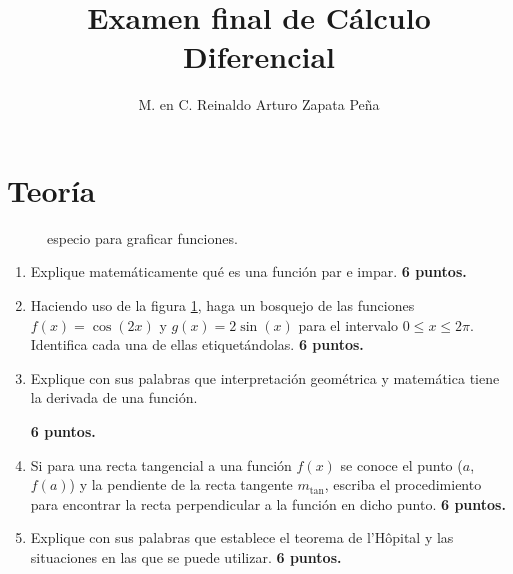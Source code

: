 \documentclass{article}
\title{Examen final de Cálculo Diferencial}
\author{M. en C. Reinaldo Arturo Zapata Peña}
\begin{document}


\section{Teoría} %
\label{sec:teoria}


\begin{figure}[b]
    \centering
    \caption{especio  para graficar funciones.}
    \label{fig:graficar}
\end{figure}
\begin{enumerate}
\item Explique matemáticamente qué es una función par e impar.
\hfill \textbf{6 puntos.}

\item Haciendo uso de la figura \ref{fig:graficar}, haga un bosquejo de las
funciones $f(x)=\cos(2x)$ y $g(x)=2\sin(x)$ para el intervalo $0 \leq x \leq
2\pi$. Identifica cada una de ellas etiquet\'andolas.
\hfill \textbf{6 puntos.}

\item Explique con sus palabras que interpretación geométrica y matemática tiene
la derivada de una función.

\hfill \textbf{6 puntos.}

\item Si para una recta tangencial a una función $f(x)$ se conoce el punto
($a$,$f(a)$) y la pendiente de la recta tangente $m_{\text{tan}}$, escriba el
procedimiento para encontrar la recta perpendicular a la función en dicho punto.
\hfill \textbf{6 puntos.}

\item Explique con sus palabras que establece el teorema de l'H\^opital y las
situaciones en las que se puede utilizar.
\hfill \textbf{6 puntos.}

\end{enumerate}
\end{document}
